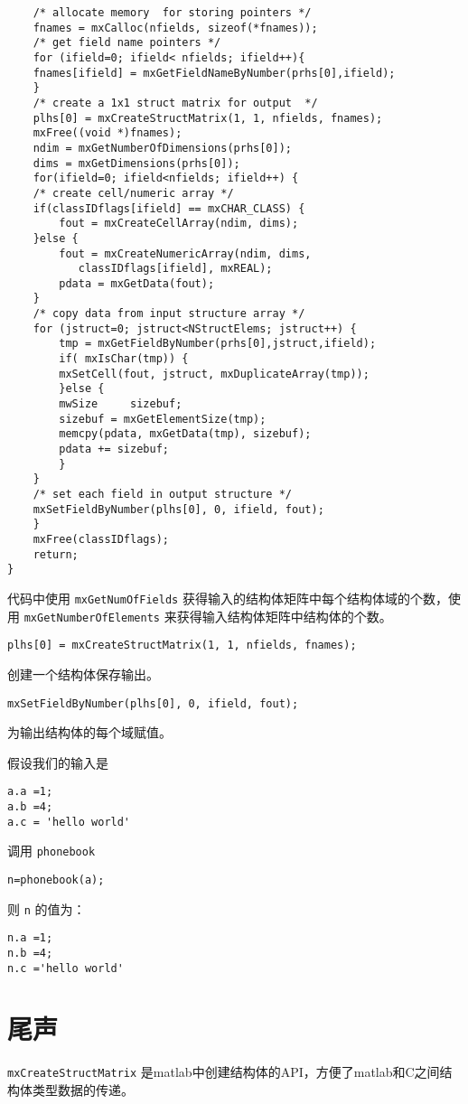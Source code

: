 \documentclass[10pt,a4paper,UTF8]{article}
\begin{document}
\begin{lstlisting}
    /* allocate memory  for storing pointers */
    fnames = mxCalloc(nfields, sizeof(*fnames));
    /* get field name pointers */
    for (ifield=0; ifield< nfields; ifield++){
	fnames[ifield] = mxGetFieldNameByNumber(prhs[0],ifield);
    }
    /* create a 1x1 struct matrix for output  */
    plhs[0] = mxCreateStructMatrix(1, 1, nfields, fnames);
    mxFree((void *)fnames);
    ndim = mxGetNumberOfDimensions(prhs[0]);
    dims = mxGetDimensions(prhs[0]);
    for(ifield=0; ifield<nfields; ifield++) {
	/* create cell/numeric array */
	if(classIDflags[ifield] == mxCHAR_CLASS) {
	    fout = mxCreateCellArray(ndim, dims);
	}else {
	    fout = mxCreateNumericArray(ndim, dims,
		   classIDflags[ifield], mxREAL);
	    pdata = mxGetData(fout);
	}
	/* copy data from input structure array */
	for (jstruct=0; jstruct<NStructElems; jstruct++) {
	    tmp = mxGetFieldByNumber(prhs[0],jstruct,ifield);
	    if( mxIsChar(tmp)) {
		mxSetCell(fout, jstruct, mxDuplicateArray(tmp));
	    }else {
		mwSize     sizebuf;
		sizebuf = mxGetElementSize(tmp);
		memcpy(pdata, mxGetData(tmp), sizebuf);
		pdata += sizebuf;
	    }
	}
	/* set each field in output structure */
	mxSetFieldByNumber(plhs[0], 0, ifield, fout);
    }
    mxFree(classIDflags);
    return;
}
\end{lstlisting}
代码中使用 \texttt{mxGetNumOfFields} 获得输入的结构体矩阵中每个结构体域的个数，使用 \texttt{mxGetNumberOfElements} 来获得输入结构体矩阵中结构体的个数。

\lstset{language=C,label= ,caption= ,captionpos=b,numbers=none}
\begin{lstlisting}
plhs[0] = mxCreateStructMatrix(1, 1, nfields, fnames);
\end{lstlisting}
创建一个结构体保存输出。

\lstset{language=C,label= ,caption= ,captionpos=b,numbers=none}
\begin{lstlisting}
mxSetFieldByNumber(plhs[0], 0, ifield, fout);
\end{lstlisting}
为输出结构体的每个域赋值。

假设我们的输入是
\begin{verbatim}
a.a =1;
a.b =4;
a.c = 'hello world'
\end{verbatim}

调用 \texttt{phonebook}
\begin{verbatim}
n=phonebook(a);
\end{verbatim}
则 \texttt{n} 的值为：
\begin{verbatim}
n.a =1;
n.b =4;
n.c ='hello world'
\end{verbatim}
\section{尾声}
\label{sec:orgheadline4}


\texttt{mxCreateStructMatrix} 是matlab中创建结构体的API，方便了matlab和C之间结构体类型数据的传递。
\end{document}
